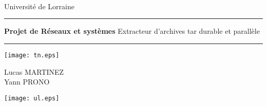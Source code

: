 \thispagestyle{empty}


\begin{flushleft}
\school\\
\schoolAddress\\
\schoolCodeAndCity\\
Université de Lorraine\\
\end{flushleft}

\vspace{0.6cm}

\begin{center}
\rule{\textwidth}{0.8pt}

\vspace{0.6cm}

\baselineskip=3pt
{\Huge \bfseries{Projet de Réseaux et systèmes}}
\LARGE{Extracteur d'archives tar durable et
parallèle}\\

\vspace{0.2cm}

\rule{\textwidth}{0.8pt}
\end{center}

\vspace{1cm}

	\begin{center}
		\texttt{[image: tn.eps]}
	\end{center}

	\vspace{0.5cm}
	\begin{center}
		\Large{Lucas MARTINEZ}\\
		\Large{Yann PRONO}
	\end{center}

	\vspace{0.5cm}
	\begin{center}
		\Large{\schoolYear}
	\end{center}

\vspace{1cm}
	\begin{center}
		\texttt{[image: ul.eps]}
	\end{center}